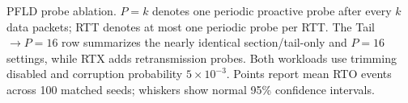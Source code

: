\caption{PFLD probe ablation. $P=k$ denotes one periodic proactive probe
after every $k$ data packets; RTT denotes at most one periodic probe per RTT.
The Tail $\rightarrow P=16$ row summarizes the nearly identical
section/tail-only and $P=16$ settings, while RTX adds retransmission probes.
Both workloads use trimming disabled and corruption probability
$5\times10^{-3}$. Points report mean RTO events across 100 matched seeds;
whiskers show normal 95\% confidence intervals.}
\label{fig:probe-ablation}
